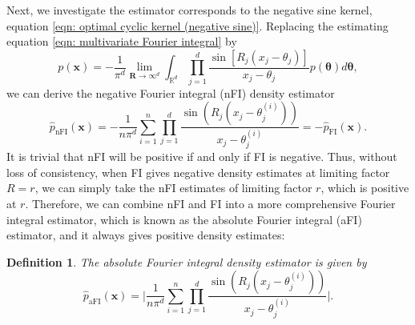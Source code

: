 \documentclass[%
 reprint,
 amsmath,amssymb,
 aps,
]{revtex4-2}
\newtheorem{definition}[theorem]{Definition}
\def\R{\mathbb{R}}
\def\btheta{\boldsymbol{\theta}}
\def\btheta{\boldsymbol{\theta}}
\def\xbold{\mathbf{x}}
\def\Rbold{\mathbf{R}}
\newcommand{\btheta}{\mbox{\boldmath $\theta$}}
\begin{document}
Next, we investigate the estimator corresponds to the negative sine kernel, equation 
\eqref{eqn: optimal cyclic kernel (negative sine)}. Replacing the estimating equation \eqref{eqn: multivariate Fourier integral} by
\begin{equation} \label{eqn: negative multivariate Fourier integral}
    p(\xbold) = -\frac{1}{\pi^d} \lim_{\Rbold \to \infty^d} \int_{\R^d} \prod_{j=1}^d \frac{\sin[R_j(x_j-\theta_j)]}{x_j-\theta_j} p(\btheta)d\btheta,
\end{equation}
we can derive the negative Fourier integral (nFI) density estimator
\begin{equation} \label{eqn: multivariate negative Fourier integral density estimator}
    \hat{p}_\text{nFI}(\mathbf{x}) = -\frac{1}{n\pi^d}\sum_{i = 1}^n \prod_{j = 1}^d \frac{\sin(R_j(x_j - \theta_j^{(i)}))}{x_j - \theta_j^{(i)}} = -\hat{p}_\text{FI}(\mathbf{x}).
\end{equation}
It is trivial that nFI will be positive if and only if FI is negative. Thus, without loss of consistency, when FI gives negative density estimates at limiting factor $R=r$, we can simply take the nFI estimates of limiting factor $r$, which is positive at $r$. Therefore, we can combine nFI and FI into a more comprehensive Fourier integral estimator, which is known as the absolute Fourier integral (aFI) estimator, and it always gives positive density estimates:
\begin{definition}
    The absolute Fourier integral density estimator is given by
    \begin{equation} \label{eqn: absolute Fourier integral estimator}
        \hat{p}_\text{aFI}(\mathbf{x}) = \bigg|\frac{1}{n\pi^d}\sum_{i = 1}^n \prod_{j = 1}^d \frac{\sin(R_j(x_j - \theta_j^{(i)}))}{x_j - \theta_j^{(i)}}\bigg|.
    \end{equation}
\end{definition}
\end{document}
